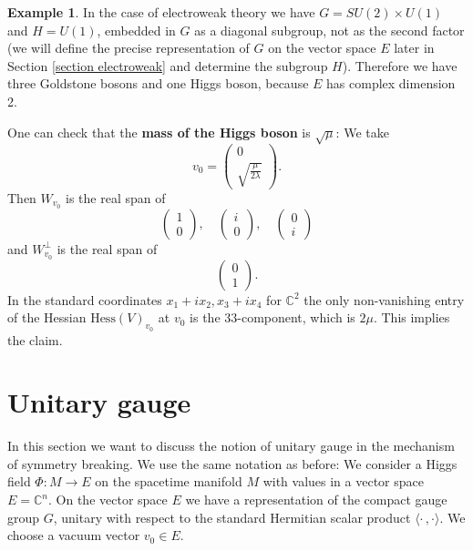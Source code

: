 \documentclass[12pt]{amsart}
\theoremstyle{definition}
\newtheorem{ex}[thm]{Example}
\theoremstyle{remark}
\numberwithin{equation}{section}
\begin{document}
\begin{ex}\label{ex Higgs mass} In the case of electroweak theory we have $G=SU(2)\times U(1)$ and $H=U(1)$, embedded in $G$ as a diagonal subgroup, not as the second factor (we will define the precise representation of $G$ on the vector space $E$ later in Section \ref{section electroweak} and determine the subgroup $H$). Therefore we have three Goldstone bosons and one Higgs boson, because $E$ has complex dimension 2. 

One can check that the {\bf mass of the Higgs boson} is $\sqrt{\mu}$: We take
\begin{equation*}
v_0=\left(\begin{array}{c}0\\\sqrt{\frac{\mu}{2\lambda}} \end{array}\right).
\end{equation*}
Then $W_{v_0}$ is the real span of 
\begin{equation*}
\left(\begin{array}{c}1\\0\end{array}\right),\quad \left(\begin{array}{c}i\\0\end{array}\right),\quad\left(\begin{array}{c}0\\ i\end{array}\right)
\end{equation*}
and $W_{v_0}^\perp$ is the real span of 
\begin{equation*}
\left(\begin{array}{c}0\\1\end{array}\right).
\end{equation*}
In the standard coordinates $x_1+ix_2,x_3+ix_4$ for $\mathbb{C}^2$ the only non-vanishing entry of the Hessian $\mathrm{Hess}(V)_{v_0}$ at $v_0$ is the $33$-component, which is $2\mu$. This implies the claim.
\end{ex}




\section{Unitary gauge}\label{sect unitary gauge}

In this section we want to discuss the notion of unitary gauge in the mechanism of symmetry breaking. We use the same notation as before: We consider a Higgs field $\Phi\colon M\rightarrow E$ on the spacetime manifold $M$ with values in a vector space $E=\mathbb{C}^n$. On the vector space $E$ we have a representation of the compact gauge group $G$, unitary with respect to the standard Hermitian scalar product $\langle\cdot\,,\cdot\rangle$. We choose a vacuum vector $v_0\in E$.
\end{document}
